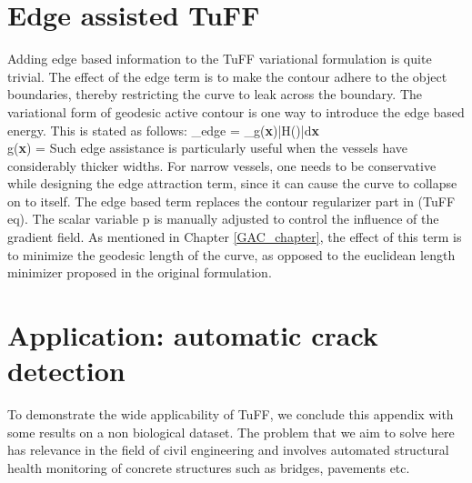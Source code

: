 \section{Edge assisted TuFF}
Adding edge based information to the TuFF variational formulation is quite trivial. The effect of the edge term is to make the contour adhere to the object boundaries, thereby restricting the curve to leak across the boundary. The variational form of geodesic active contour \cite{caselles_GAC} is one way to introduce the edge based energy. This is stated as follows:
\bea
{}_{edge} = \displaystyle \int_\Omega g(\textbf{x})|\nabla H(\phi)|d\textbf{x} \nn \\
\quad g(\textbf{x}) = 
\label{eq:edge_energy}
\eea
Such edge assistance is particularly useful when the  vessels have considerably thicker widths. For narrow vessels, one needs to be conservative while designing the edge attraction term, since it can cause the curve to collapse on to itself. 
The edge based term replaces the contour regularizer part in (TuFF eq). The scalar variable p is manually adjusted to control the influence of the gradient field.  As mentioned in Chapter \ref{GAC_chapter}, the effect of this term is to minimize the geodesic length of the curve, as opposed to the euclidean length minimizer proposed in the original formulation.

\section{Application: automatic crack detection}

To demonstrate the wide applicability of TuFF, we conclude this appendix with some results on a non biological dataset. The problem that we aim to solve here has relevance in the field of civil engineering and involves automated structural health monitoring of concrete structures such as bridges, pavements etc. 

